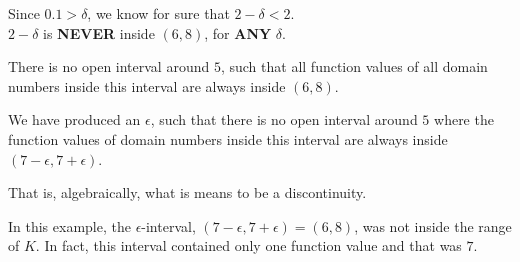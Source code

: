 \documentclass{ximera}
\begin{document}
\begin{example}
\begin{image}
\end{image}



Since $0.1 > \delta$, we know for sure that $2 - \delta < 2$.  \\
$2 - \delta$ is \textbf{\textcolor{red!70!black}{NEVER}} inside $(6, 8)$, for \textbf{\textcolor{red!70!black}{ANY}} $\delta$.



There is no open interval around $5$, such that all function values of all domain numbers inside this interval are always inside $(6,8)$. 




We have produced an $\epsilon$, such that there is no open interval around $5$ where the function values of domain numbers inside this interval are always inside $(7-\epsilon , 7+\epsilon)$.


That is, algebraically, what is means to be a discontinuity.




\end{example}


In this example, the $\epsilon$-interval, $(7-\epsilon, 7+\epsilon) = (6,8)$, was not inside the range of $K$.  In fact, this interval contained only one function value and that was $7$.
\end{document}
